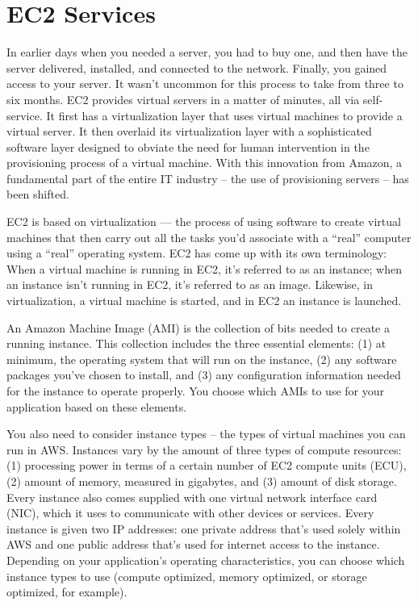 \documentclass[]{book}
\begin{document}
\hypertarget{ec2-services}{%
\section{EC2 Services}\label{ec2-services}}

In earlier days when you needed a server, you had to buy one, and then have the server delivered, installed, and connected to the network. Finally, you gained access to your server. It wasn't uncommon for this process to take from three to six months. EC2 provides virtual servers in a matter of minutes, all via self-service. It first has a virtualization layer that uses virtual machines to provide a virtual server. It then overlaid its virtualization layer with a sophisticated software layer designed to obviate the need for human intervention in the provisioning process of a virtual machine. With this innovation from Amazon, a fundamental part of the entire IT industry -- the use of provisioning servers -- has been shifted.

EC2 is based on virtualization --- the process of using software to create virtual machines that then carry out all the tasks you'd associate with a ``real'' computer using a ``real'' operating system. EC2 has come up with its own terminology: When a virtual machine is running in EC2, it's referred to as an instance; when an instance isn't running in EC2, it's referred to as an image. Likewise, in virtualization, a virtual machine is started, and in EC2 an instance is launched.

An Amazon Machine Image (AMI) is the collection of bits needed to create a running instance. This collection includes the three essential elements: (1) at minimum, the operating system that will run on the instance, (2) any software packages you've chosen to install, and (3) any configuration information needed for the instance to operate properly. You choose which AMIs to use for your application based on these elements.

You also need to consider instance types -- the types of virtual machines you can run in AWS. Instances vary by the amount of three types of compute resources: (1) processing power in terms of a certain number of EC2 compute units (ECU), (2) amount of memory, measured in gigabytes, and (3) amount of disk storage. Every instance also comes supplied with one virtual network interface card (NIC), which it uses to communicate with other devices or services. Every instance is given two IP addresses: one private address that's used solely within AWS and one public address that's used for internet access to the instance. Depending on your application's operating characteristics, you can choose which instance types to use (compute optimized, memory optimized, or storage optimized, for example).
\end{document}
